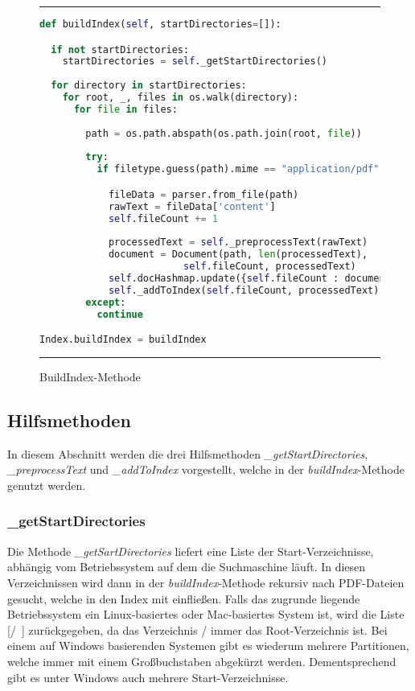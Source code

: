 \begin{figure}
	\rule{\textwidth}{0.4pt}
		\begin{lstlisting}[language=Python]
def buildIndex(self, startDirectories=[]):

  if not startDirectories:
    startDirectories = self._getStartDirectories()
    
  for directory in startDirectories:
    for root, _, files in os.walk(directory):
      for file in files:
                
        path = os.path.abspath(os.path.join(root, file))
                
        try:
          if filetype.guess(path).mime == "application/pdf":

            fileData = parser.from_file(path)
            rawText = fileData['content']
            self.fileCount += 1
                    
            processedText = self._preprocessText(rawText)
            document = Document(path, len(processedText),
                         self.fileCount, processedText)
            self.docHashmap.update({self.fileCount : document})
            self._addToIndex(self.fileCount, processedText)
        except:
          continue

Index.buildIndex = buildIndex
		\end{lstlisting}
	\rule{\textwidth}{0.4pt}
	\caption{BuildIndex-Methode}
	\label{fig:build}
\end{figure}

\subsection{Hilfsmethoden}\label{hilfsmethoden}

In diesem Abschnitt werden die drei Hilfsmethoden \textit{\_getStartDirectories}, \textit{\_preprocessText} und \textit{\_addToIndex} vorgestellt, welche in der \textit{buildIndex}-Methode genutzt werden.

\subsubsection{\_getStartDirectories}

Die Methode \textit{\_getSartDirectories} liefert eine Liste der Start-Verzeichnisse, abhängig vom Betriebssystem auf dem die Suchmaschine läuft. In diesen Verzeichnissen wird dann in der \textit{buildIndex}-Methode rekursiv nach PDF-Dateien gesucht, welche in den Index mit einfließen. Falls das zugrunde liegende Betriebssystem ein Linux-basiertes oder Mac-basiertes System ist, wird die Liste [\glqq /\grqq\ ] zurückgegeben, da das Verzeichnis / immer das Root-Verzeichnis ist. Bei einem auf Windows basierenden Systemen gibt es wiederum mehrere Partitionen, welche immer mit einem Großbuchstaben abgekürzt werden. Dementsprechend gibt es unter Windows auch mehrere Start-Verzeichnisse.

